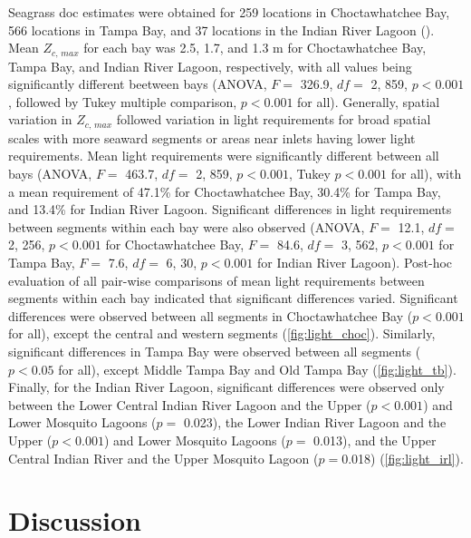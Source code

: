 \documentclass[letterpaper,12pt,oneside]{article}\usepackage[]{graphicx}\usepackage[]{color}
\begin{document}
Seagrass \ac{doc} estimates were obtained for 259 locations in Choctawhatchee Bay, 566 locations in Tampa Bay, and 37 locations in the Indian River Lagoon ().  Mean $Z_{c,\,max}$ for each bay was 2.5, 1.7, and 1.3 m for Choctawhatchee Bay, Tampa Bay, and Indian River Lagoon, respectively, with all values being significantly different beetween bays (ANOVA, $F=$ 326.9, $df =$ 2, 859, $p < 0.001$, followed by Tukey multiple comparison, $p<0.001$ for all).  Generally, spatial variation in $Z_{c,\,max}$ followed variation in light requirements for broad spatial scales with more seaward segments or areas near inlets having lower light requirements.  Mean light requirements were significantly different between all bays (ANOVA, $F=$ 463.7, $df =$ 2, 859, $p < 0.001$, Tukey $p<0.001$ for all), with a mean requirement of 47.1\% for Choctawhatchee Bay, 30.4\% for Tampa Bay, and 13.4\% for Indian River Lagoon.  Significant differences in light requirements between segments within each bay were also observed (ANOVA, $F =$ 12.1, $df =$ 2, 256, $p < 0.001$ for Choctawhatchee Bay, $F =$ 84.6, $df =$ 3, 562, $p < 0.001$ for Tampa Bay, $F =$ 7.6, $df =$ 6, 30, $p < 0.001$ for Indian River Lagoon).  Post-hoc evaluation of all pair-wise comparisons of mean light requirements between segments within each bay indicated that significant differences varied.  Significant differences were observed between all segments in Choctawhatchee Bay ($p<0.001$ for all), except the central and western segments (\cref{fig:light_choc}).  Similarly, significant differences in Tampa Bay were observed between all segments ($p<0.05$ for all), except Middle Tampa Bay and Old Tampa Bay (\cref{fig:light_tb}).  Finally, for the Indian River Lagoon, significant differences were observed only between the Lower Central Indian River Lagoon and the Upper ($p<0.001$) and Lower Mosquito Lagoons ($p = $ 0.023),  the Lower Indian River Lagoon and the Upper ($p<0.001$) and Lower Mosquito Lagoons ($p =$ 0.013), and the Upper Central Indian River and the Upper Mosquito Lagoon ($p = $0.018) (\cref{fig:light_irl}).

\section{Discussion}
\end{document}
